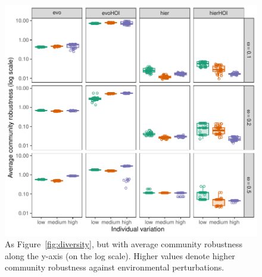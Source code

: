 \documentclass[11pt]{article}
\begin{document}
\begin{figure}[p]
  \centering
  \includegraphics[width=\textwidth]{robustness.pdf}
  \caption{As Figure~\ref{fig:diversity}, but with average community robustness along the y-axis (on the log scale). Higher values denote higher community robustness against environmental perturbations.}
  \label{fig:robustness}
\end{figure}
\end{document}
